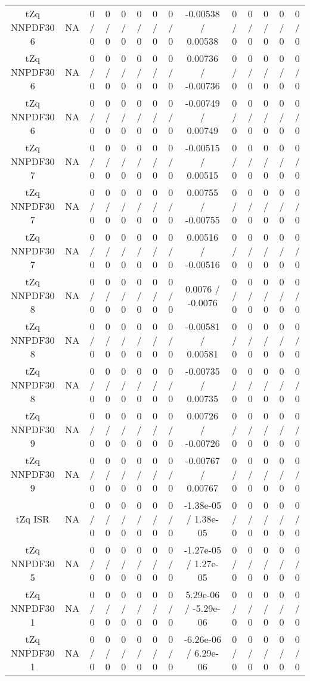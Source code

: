 \documentclass[10pt]{article}
\begin{document}
\begin{table}[htbp]
\begin{center}
\begin{tabular}{|c|c|c|c|c|c|c|c|c|c|c|c|c|c|}
  tZq NNPDF30 6 &    NA    & 0 / 0 & 0 / 0 & 0 / 0 & 0 / 0 & 0 / 0 & 0 / 0 & -0.00538 / 0.00538 & 0 / 0 & 0 / 0 & 0 / 0 & 0 / 0 & 0 / 0 \\ 
  tZq NNPDF30 6 &    NA    & 0 / 0 & 0 / 0 & 0 / 0 & 0 / 0 & 0 / 0 & 0 / 0 & 0.00736 / -0.00736 & 0 / 0 & 0 / 0 & 0 / 0 & 0 / 0 & 0 / 0 \\ 
  tZq NNPDF30 6 &    NA    & 0 / 0 & 0 / 0 & 0 / 0 & 0 / 0 & 0 / 0 & 0 / 0 & -0.00749 / 0.00749 & 0 / 0 & 0 / 0 & 0 / 0 & 0 / 0 & 0 / 0 \\ 
  tZq NNPDF30 7 &    NA    & 0 / 0 & 0 / 0 & 0 / 0 & 0 / 0 & 0 / 0 & 0 / 0 & -0.00515 / 0.00515 & 0 / 0 & 0 / 0 & 0 / 0 & 0 / 0 & 0 / 0 \\ 
  tZq NNPDF30 7 &    NA    & 0 / 0 & 0 / 0 & 0 / 0 & 0 / 0 & 0 / 0 & 0 / 0 & 0.00755 / -0.00755 & 0 / 0 & 0 / 0 & 0 / 0 & 0 / 0 & 0 / 0 \\ 
  tZq NNPDF30 7 &    NA    & 0 / 0 & 0 / 0 & 0 / 0 & 0 / 0 & 0 / 0 & 0 / 0 & 0.00516 / -0.00516 & 0 / 0 & 0 / 0 & 0 / 0 & 0 / 0 & 0 / 0 \\ 
  tZq NNPDF30 8 &    NA    & 0 / 0 & 0 / 0 & 0 / 0 & 0 / 0 & 0 / 0 & 0 / 0 & 0.0076 / -0.0076 & 0 / 0 & 0 / 0 & 0 / 0 & 0 / 0 & 0 / 0 \\ 
  tZq NNPDF30 8 &    NA    & 0 / 0 & 0 / 0 & 0 / 0 & 0 / 0 & 0 / 0 & 0 / 0 & -0.00581 / 0.00581 & 0 / 0 & 0 / 0 & 0 / 0 & 0 / 0 & 0 / 0 \\ 
  tZq NNPDF30 8 &    NA    & 0 / 0 & 0 / 0 & 0 / 0 & 0 / 0 & 0 / 0 & 0 / 0 & -0.00735 / 0.00735 & 0 / 0 & 0 / 0 & 0 / 0 & 0 / 0 & 0 / 0 \\ 
  tZq NNPDF30 9 &    NA    & 0 / 0 & 0 / 0 & 0 / 0 & 0 / 0 & 0 / 0 & 0 / 0 & 0.00726 / -0.00726 & 0 / 0 & 0 / 0 & 0 / 0 & 0 / 0 & 0 / 0 \\ 
  tZq NNPDF30 9 &    NA    & 0 / 0 & 0 / 0 & 0 / 0 & 0 / 0 & 0 / 0 & 0 / 0 & -0.00767 / 0.00767 & 0 / 0 & 0 / 0 & 0 / 0 & 0 / 0 & 0 / 0 \\ 
  tZq ISR &    NA    & 0 / 0 & 0 / 0 & 0 / 0 & 0 / 0 & 0 / 0 & 0 / 0 & -1.38e-05 / 1.38e-05 & 0 / 0 & 0 / 0 & 0 / 0 & 0 / 0 & 0 / 0 \\ 
  tZq NNPDF30 5 &    NA    & 0 / 0 & 0 / 0 & 0 / 0 & 0 / 0 & 0 / 0 & 0 / 0 & -1.27e-05 / 1.27e-05 & 0 / 0 & 0 / 0 & 0 / 0 & 0 / 0 & 0 / 0 \\ 
  tZq NNPDF30 1 &    NA    & 0 / 0 & 0 / 0 & 0 / 0 & 0 / 0 & 0 / 0 & 0 / 0 & 5.29e-06 / -5.29e-06 & 0 / 0 & 0 / 0 & 0 / 0 & 0 / 0 & 0 / 0 \\ 
  tZq NNPDF30 1 &    NA    & 0 / 0 & 0 / 0 & 0 / 0 & 0 / 0 & 0 / 0 & 0 / 0 & -6.26e-06 / 6.29e-06 & 0 / 0 & 0 / 0 & 0 / 0 & 0 / 0 & 0 / 0 \\ 

\end{tabular}
\end{center}
\end{table}
\end{document}
